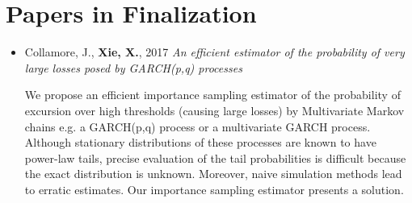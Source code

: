 \documentclass[a4paper]{twentysecondcv} %
\begin{document}
\pagebreak
\makeprofile %

\section{Papers in Finalization}
\begin{itemize}
\item Collamore, J., {\bf Xie, X.}, 2017
  {\it An efficient estimator of the probability of very large losses
    posed by GARCH(p,q) processes}

  {\small
    We propose an efficient importance sampling estimator of the
    probability of excursion over high thresholds (causing large
    losses) by Multivariate Markov chains e.g. a GARCH(p,q) process or
    a multivariate GARCH process.
    Although stationary distributions of these processes are known
    to have power-law tails, precise evaluation of the tail
    probabilities is difficult because the exact distribution is
    unknown. Moreover, naive simulation methods lead to erratic
    estimates. Our importance sampling estimator presents a solution.
  }
\end{itemize}






\end{document}
